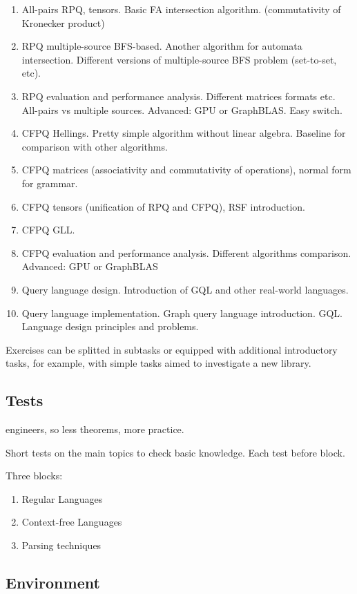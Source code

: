 \documentclass[sigconf]{acmart}
\begin{document}
\begin{enumerate}
  \item All-pairs RPQ, tensors. Basic FA intersection algorithm. (commutativity of Kronecker product)
  \item RPQ multiple-source BFS-based. Another algorithm for automata intersection. Different versions of multiple-source BFS problem (set-to-set, etc).  
  \item RPQ evaluation and performance analysis. Different matrices formats etc. All-pairs vs multiple sources. Advanced: GPU or GraphBLAS. Easy switch.
  \item CFPQ Hellings. Pretty simple algorithm without linear algebra. Baseline for comparison with other algorithms. 
  \item CFPQ matrices (associativity and commutativity of operations), normal form for grammar.
  \item CFPQ tensors (unification of RPQ and CFPQ), RSF introduction.
  \item CFPQ GLL. 
  \item CFPQ evaluation and performance analysis. Different algorithms comparison. Advanced: GPU or GraphBLAS 
  \item Query language design. Introduction of GQL and other real-world languages. 
  \item Query language implementation. Graph query language introduction. GQL. Language design principles and problems.
\end{enumerate}

Exercises can be splitted in subtasks or equipped with additional introductory tasks, for example, with simple tasks aimed to investigate a new library.

\subsection{Tests}

engineers, so less theorems, more practice.

Short tests on the main topics to check basic knowledge.
Each test before block. 

Three blocks:
\begin{enumerate}
  \item Regular Languages
  \item Context-free Languages
  \item Parsing techniques
\end{enumerate}

\subsection{Environment}
\end{document}
